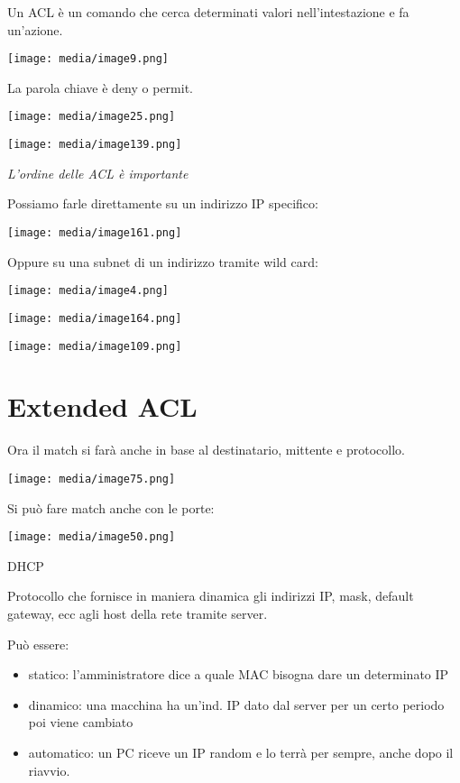 Un ACL è un comando che cerca determinati valori nell'intestazione e fa
un'azione.

\texttt{[image: media/image9.png]}

La parola chiave è deny o permit.

\texttt{[image: media/image25.png]}

\texttt{[image: media/image139.png]}

\emph{L'ordine delle ACL è importante}

Possiamo farle direttamente su un indirizzo IP specifico:

\texttt{[image: media/image161.png]}

Oppure su una subnet di un indirizzo tramite wild card:

\texttt{[image: media/image4.png]}

\texttt{[image: media/image164.png]}

\texttt{[image: media/image109.png]}

\section{Extended ACL}\label{extended-acl}

Ora il match si farà anche in base al destinatario, mittente e
protocollo.

\texttt{[image: media/image75.png]}

Si può fare match anche con le porte:

\texttt{[image: media/image50.png]}

DHCP

Protocollo che fornisce in maniera dinamica gli indirizzi IP, mask,
default gateway, ecc agli host della rete tramite server.

Può essere:

\begin{itemize}
\item
  statico: l'amministratore dice a quale MAC bisogna dare un determinato
  IP
\item
  dinamico: una macchina ha un'ind. IP dato dal server per un certo
  periodo poi viene cambiato
\item
  automatico: un PC riceve un IP random e lo terrà per sempre, anche
  dopo il riavvio.
\end{itemize}

